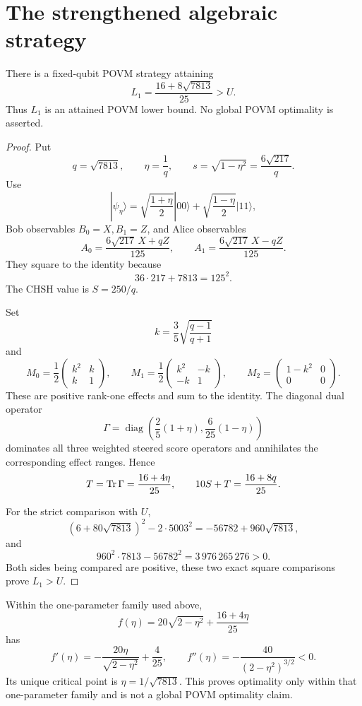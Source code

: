 \section{The strengthened algebraic strategy}
\label{app:strengthened}

\begin{proposition}
\label{prop:strengthened-strategy}
There is a fixed-qubit POVM strategy attaining
\[
L_1=\frac{16+8\sqrt{7813}}{25}>U.
\]
Thus \(L_1\) is an attained POVM lower bound. No global POVM optimality is
asserted.
\end{proposition}

\begin{proof}
Put
\[
q=\sqrt{7813},\qquad \eta=\frac1q,\qquad
s=\sqrt{1-\eta^2}=\frac{6\sqrt{217}}q.
\]
Use
\[
|\psi_\eta\rangle=
\sqrt{\frac{1+\eta}{2}}|00\rangle+
\sqrt{\frac{1-\eta}{2}}|11\rangle,
\]
Bob observables \(B_0=X,B_1=Z\), and Alice observables
\[
A_0=\frac{6\sqrt{217}\,X+qZ}{125},\qquad
A_1=\frac{6\sqrt{217}\,X-qZ}{125}.
\]
They square to the identity because
\[
36\cdot217+7813=125^2.
\]
The CHSH value is \(S=250/q\).

Set
\[
k=\frac35\sqrt{\frac{q-1}{q+1}}
\]
and
\[
M_0=\frac12\begin{pmatrix}k^2&k\\k&1\end{pmatrix},\qquad
M_1=\frac12\begin{pmatrix}k^2&-k\\-k&1\end{pmatrix},\qquad
M_2=\begin{pmatrix}1-k^2&0\\0&0\end{pmatrix}.
\]
These are positive rank-one effects and sum to the identity. The diagonal
dual operator
\[
\Gamma=
\operatorname{diag}\!\left(
\frac25(1+\eta),\frac6{25}(1-\eta)\right)
\]
dominates all three weighted steered score operators and annihilates the
corresponding effect ranges. Hence
\[
T=\operatorname{Tr}\Gamma=\frac{16+4\eta}{25},
\qquad
10S+T=\frac{16+8q}{25}.
\]

For the strict comparison with \(U\),
\[
(6+80\sqrt{7813})^2-2\cdot5003^2
=-56782+960\sqrt{7813},
\]
and
\[
960^2\cdot7813-56782^2=3\,976\,265\,276>0.
\]
Both sides being compared are positive, these two exact square comparisons
prove \(L_1>U\).
\end{proof}

\begin{remark}
Within the one-parameter family used above,
\[
f(\eta)=20\sqrt{2-\eta^2}+\frac{16+4\eta}{25}
\]
has
\[
f'(\eta)=-\frac{20\eta}{\sqrt{2-\eta^2}}+\frac4{25},\qquad
f''(\eta)=-\frac{40}{(2-\eta^2)^{3/2}}<0.
\]
Its unique critical point is \(\eta=1/\sqrt{7813}\). This proves optimality
only within that one-parameter family and is not a global POVM optimality
claim.
\end{remark}

